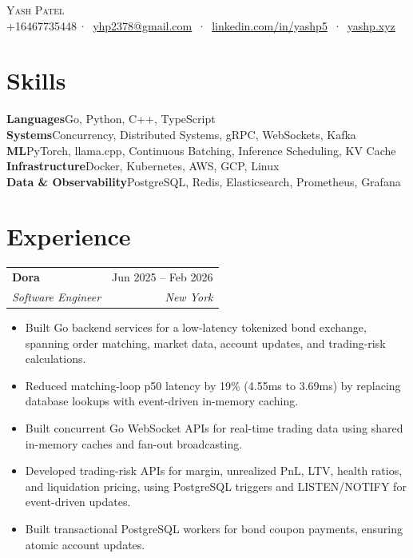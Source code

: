 \documentclass[letterpaper,12pt]{article}
\makeatletter
\newcommand{\entry}[4]{%
  \begin{tabularx}{\textwidth}{@{}X@{}r@{}}
    \textbf{#1} & {\small\color{muted}#2} \\
    {\small\itshape #3} & {\small\itshape\color{muted}#4} \\
  \end{tabularx}\vspace{3pt}
}
\newenvironment{bullets}
  {\begin{itemize}[leftmargin=1.1em, itemsep=0pt, topsep=0pt, parsep=0pt, label={\color{muted}\footnotesize\textbullet}]\fontsize{11}{13.0}\selectfont}
  {\end{itemize}\vspace{-3pt}}
\newcommand{\skill}[2]{\textbf{#1}\enspace {\color{muted}·}\enspace #2\\[-1pt]}
\makeatother
\begin{document}
\begin{center}
  {\huge\scshape Yash Patel}\\[1pt]
  {\small
    +16467735448\,{\color{muted}·}\,
    \href{mailto:yhp2378@gmail.com}{yhp2378@gmail.com}
    \,{\color{muted}·}\,
    \href{https://www.linkedin.com/in/yashp5/}{linkedin.com/in/yashp5}
    \,{\color{muted}·}\,
    \href{https://yashp.xyz/}{yashp.xyz}
  }
\end{center}
\vspace{-12pt}

\section{Skills}\vspace{1.2pt}
{\small
\skill{Languages}{Go, Python, C++, TypeScript}
\skill{Systems}{Concurrency, Distributed Systems, gRPC, WebSockets, Kafka}
\skill{ML}{PyTorch, llama.cpp, Continuous Batching, Inference Scheduling, KV Cache}
\skill{Infrastructure}{Docker, Kubernetes, AWS, GCP, Linux}
\skill{Data \& Observability}{PostgreSQL, Redis, Elasticsearch, Prometheus, Grafana}
}

\section{Experience}

\entry{Dora}{Jun 2025 -- Feb 2026}{Software Engineer}{New York}
\begin{bullets}
  \item Built Go backend services for a low-latency tokenized bond exchange, spanning order matching, market data, account updates, and trading-risk calculations.
  \item Reduced matching-loop p50 latency by 19\% (4.55ms to 3.69ms) by replacing database lookups with event-driven in-memory caching.
  \item Built concurrent Go WebSocket APIs for real-time trading data using shared in-memory caches and fan-out broadcasting.
  \item Developed trading-risk APIs for margin, unrealized PnL, LTV, health ratios, and liquidation pricing, using PostgreSQL triggers and LISTEN/NOTIFY for event-driven updates.
  \item Built transactional PostgreSQL workers for bond coupon payments, ensuring atomic account updates.
\end{bullets}
\end{document}
